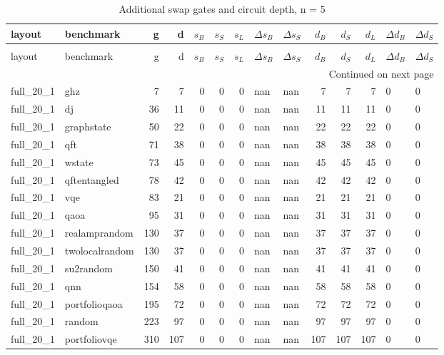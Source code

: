 \thispagestyle{empty}
\begin{longtable}{llrrrrrllrrrll}
\caption{Additional swap gates and circuit depth, n = 5} \label{benchmark-table-5} \\
\toprule
layout & benchmark & g & d & $s_B$ & $s_S$ & $s_L$ & $\Delta s_B$ & $\Delta s_S$ & $d_B$ & $d_S$ & $d_L$ & $\Delta d_B$ & $\Delta d_S$ \\
\midrule
\endfirsthead
\caption[]{Additional swap gates and circuit depth, n = 5} \\
\toprule
layout & benchmark & g & d & $s_B$ & $s_S$ & $s_L$ & $\Delta s_B$ & $\Delta s_S$ & $d_B$ & $d_S$ & $d_L$ & $\Delta d_B$ & $\Delta d_S$ \\
\midrule
\endhead
\midrule
\multicolumn{14}{r}{Continued on next page} \\
\midrule
\endfoot
\bottomrule
\endlastfoot
full\_20\_1 & ghz & 7 & 7 & 0 & 0 & 0 & nan & nan & 7 & 7 & 7 & 0 & 0 \\
full\_20\_1 & dj & 36 & 11 & 0 & 0 & 0 & nan & nan & 11 & 11 & 11 & 0 & 0 \\
full\_20\_1 & graphstate & 50 & 22 & 0 & 0 & 0 & nan & nan & 22 & 22 & 22 & 0 & 0 \\
full\_20\_1 & qft & 71 & 38 & 0 & 0 & 0 & nan & nan & 38 & 38 & 38 & 0 & 0 \\
full\_20\_1 & wstate & 73 & 45 & 0 & 0 & 0 & nan & nan & 45 & 45 & 45 & 0 & 0 \\
full\_20\_1 & qftentangled & 78 & 42 & 0 & 0 & 0 & nan & nan & 42 & 42 & 42 & 0 & 0 \\
full\_20\_1 & vqe & 83 & 21 & 0 & 0 & 0 & nan & nan & 21 & 21 & 21 & 0 & 0 \\
full\_20\_1 & qaoa & 95 & 31 & 0 & 0 & 0 & nan & nan & 31 & 31 & 31 & 0 & 0 \\
full\_20\_1 & realamprandom & 130 & 37 & 0 & 0 & 0 & nan & nan & 37 & 37 & 37 & 0 & 0 \\
full\_20\_1 & twolocalrandom & 130 & 37 & 0 & 0 & 0 & nan & nan & 37 & 37 & 37 & 0 & 0 \\
full\_20\_1 & su2random & 150 & 41 & 0 & 0 & 0 & nan & nan & 41 & 41 & 41 & 0 & 0 \\
full\_20\_1 & qnn & 154 & 58 & 0 & 0 & 0 & nan & nan & 58 & 58 & 58 & 0 & 0 \\
full\_20\_1 & portfolioqaoa & 195 & 72 & 0 & 0 & 0 & nan & nan & 72 & 72 & 72 & 0 & 0 \\
full\_20\_1 & random & 223 & 97 & 0 & 0 & 0 & nan & nan & 97 & 97 & 97 & 0 & 0 \\
full\_20\_1 & portfoliovqe & 310 & 107 & 0 & 0 & 0 & nan & nan & 107 & 107 & 107 & 0 & 0 \\

\end{longtable}
